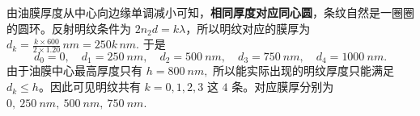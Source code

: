 \begin{solution}
由油膜厚度从中心向边缘单调减小可知，\textbf{相同厚度对应同心圆}，条纹自然是一圈圈的圆环。反射明纹条件为 \(2n_2d=k\lambda\)，所以明纹对应的膜厚为
 \(d_k=\frac{k\times 600}{2\times1.20}\,\si{nm}=250k\,\si{nm}.\) 
于是
\[
d_0=0,\quad d_1=\SI{250}{nm},\quad d_2=\SI{500}{nm},\quad d_3=\SI{750}{nm},\quad d_4=\SI{1000}{nm}.
\]
由于油膜中心最高厚度只有
 \(h=\SI{800}{nm},\) 
所以能实际出现的明纹厚度只能满足 \(d_k\le h\)。因此可见明纹共有
 \(k=0,1,2,3\) 
这 \(4\) 条。对应膜厚分别为
 \(0,\ \SI{250}{nm},\ \SI{500}{nm},\ \SI{750}{nm}.\) 
\end{solution}
